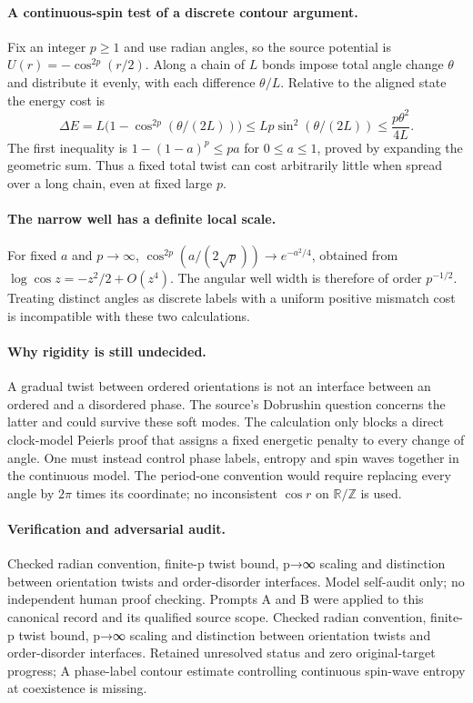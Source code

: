 \documentclass[11pt]{article}
\begin{document}
\paragraph{A continuous-spin test of a discrete contour argument.} Fix an integer $p\geq1$ and use radian angles, so the source potential is $U(r)=-\cos^{2p}(r/2)$. Along a chain of $L$ bonds impose total angle change $\theta$ and distribute it evenly, with each difference $\theta/L$. Relative to the aligned state the energy cost is
\[
 \Delta E=L\bigl(1-\cos^{2p}(\theta/(2L))\bigr)
 \leq Lp\sin^2(\theta/(2L))\leq\frac{p\theta^2}{4L}.
\]
The first inequality is $1-(1-a)^p\leq pa$ for $0\leq a\leq1$, proved by expanding the geometric sum. Thus a fixed total twist can cost arbitrarily little when spread over a long chain, even at fixed large $p$.

\paragraph{The narrow well has a definite local scale.} For fixed $a$ and $p\to\infty$, $\cos^{2p}(a/(2\sqrt p))\to e^{-a^2/4}$, obtained from $\log\cos z=-z^2/2+O(z^4)$. The angular well width is therefore of order $p^{-1/2}$. Treating distinct angles as discrete labels with a uniform positive mismatch cost is incompatible with these two calculations.

\paragraph{Why rigidity is still undecided.} A gradual twist between ordered orientations is not an interface between an ordered and a disordered phase. The source's Dobrushin question concerns the latter and could survive these soft modes. The calculation only blocks a direct clock-model Peierls proof that assigns a fixed energetic penalty to every change of angle. One must instead control phase labels, entropy and spin waves together in the continuous model. The period-one convention would require replacing every angle by $2\pi$ times its coordinate; no inconsistent $\cos r$ on $\mathbb R/\mathbb Z$ is used.

\paragraph{Verification and adversarial audit.}
Checked radian convention, finite-p twist bound, p→∞ scaling and distinction between orientation twists and order-disorder interfaces. Model self-audit only; no independent human proof checking. Prompts A and B were applied to this canonical record and its qualified source scope. Checked radian convention, finite-p twist bound, p→∞ scaling and distinction between orientation twists and order-disorder interfaces. Retained unresolved status and zero original-target progress; A phase-label contour estimate controlling continuous spin-wave entropy at coexistence is missing.
\end{document}
